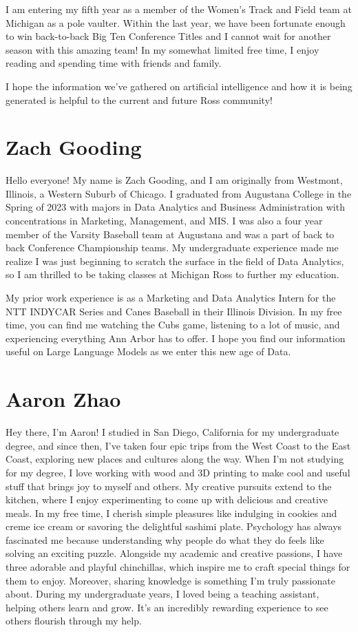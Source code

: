 \documentclass[
]{book}
\begin{document}
I am entering my fifth year as a member of the Women's Track and Field team at Michigan as a pole vaulter. Within the last year, we have been fortunate enough to win back-to-back Big Ten Conference Titles and I cannot wait for another season with this amazing team! In my somewhat limited free time, I enjoy reading and spending time with friends and family.

I hope the information we've gathered on artificial intelligence and how it is being generated is helpful to the current and future Ross community!

\hypertarget{zach-gooding}{%
\section{Zach Gooding}\label{zach-gooding}}

Hello everyone! My name is Zach Gooding, and I am originally from Westmont, Illinois, a Western Suburb of Chicago. I graduated from Augustana College in the Spring of 2023 with majors in Data Analytics and Business Administration with concentrations in Marketing, Management, and MIS. I was also a four year member of the Varsity Baseball team at Augustana and was a part of back to back Conference Championship teams. My undergraduate experience made me realize I was just beginning to scratch the surface in the field of Data Analytics, so I am thrilled to be taking classes at Michigan Ross to further my education.

My prior work experience is as a Marketing and Data Analytics Intern for the NTT INDYCAR Series and Canes Baseball in their Illinois Division. In my free time, you can find me watching the Cubs game, listening to a lot of music, and experiencing everything Ann Arbor has to offer. I hope you find our information useful on Large Language Models as we enter this new age of Data.

\hypertarget{aaron-zhao}{%
\section{Aaron Zhao}\label{aaron-zhao}}

Hey there, I'm Aaron! I studied in San Diego, California for my undergraduate degree, and since then, I've taken four epic trips from the West Coast to the East Coast, exploring new places and cultures along the way.
When I'm not studying for my degree, I love working with wood and 3D printing to make cool and useful stuff that brings joy to myself and others. My creative pursuits extend to the kitchen, where I enjoy experimenting to come up with delicious and creative meals. In my free time, I cherish simple pleasures like indulging in cookies and creme ice cream or savoring the delightful sashimi plate.
Psychology has always fascinated me because understanding why people do what they do feels like solving an exciting puzzle.
Alongside my academic and creative passions, I have three adorable and playful chinchillas, which inspire me to craft special things for them to enjoy.
Moreover, sharing knowledge is something I'm truly passionate about. During my undergraduate years, I loved being a teaching assistant, helping others learn and grow. It's an incredibly rewarding experience to see others flourish through my help.
\end{document}
